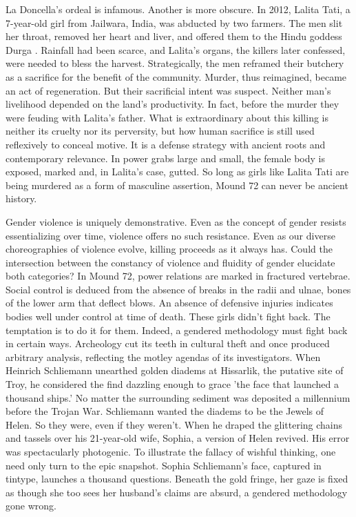 La Doncella's ordeal is infamous. Another is more obscure. In 2012, Lalita Tati, a 7-year-old girl from Jailwara, India, was abducted by two farmers. The men slit her throat, removed her heart and liver, and offered them to the Hindu goddess Durga \parencite[]{richards2012}. Rainfall had been scarce, and Lalita's organs, the killers later confessed, were needed to bless the harvest. Strategically, the men reframed their butchery as a sacrifice for the benefit of the community. Murder, thus reimagined, became an act of regeneration. But their sacrificial intent was suspect. Neither man's livelihood depended on the land's productivity. In fact, before the murder they were feuding with Lalita's father. What is extraordinary about this killing is neither its cruelty nor its perversity, but how human sacrifice is still used reflexively to conceal motive. It is a defense strategy with ancient roots and contemporary relevance. In power grabs large and small, the female body is exposed, marked and, in Lalita's case, gutted. So long as girls like Lalita Tati are being murdered as a form of masculine assertion, Mound 72 can never be ancient history. 

Gender violence is uniquely demonstrative. Even as the concept of gender resists essentializing over time, violence offers no such resistance. Even as our diverse choreographies of violence evolve, killing proceeds as it always has. Could the intersection between the constancy of violence and fluidity of gender elucidate both categories? In Mound 72, power relations are marked in fractured vertebrae. Social control is deduced from the absence of breaks in the radii and ulnae, bones of the lower arm that deflect blows. An absence of defensive injuries indicates bodies well under control at time of death. These girls didn't fight back. The temptation is to do it for them. Indeed, a gendered methodology must fight back in certain ways. Archeology cut its teeth in cultural theft and once produced arbitrary analysis, reflecting the motley agendas of its investigators. When Heinrich Schliemann unearthed golden diadems at Hissarlik, the putative site of Troy, he considered the find dazzling enough to grace 'the face that launched a thousand ships.' No matter the surrounding sediment was deposited a millennium before the Trojan War. Schliemann wanted the diadems to be the Jewels of Helen. So they were, even if they weren't. When he draped the glittering chains and tassels over his 21-year-old wife, Sophia, a version of Helen revived. His error was spectacularly photogenic. To illustrate the fallacy of wishful thinking, one need only turn to the epic snapshot. Sophia Schliemann’s face, captured in tintype, launches a thousand questions. Beneath the gold fringe, her gaze is fixed as though she too sees her husband's claims are absurd, a gendered methodology gone wrong. 

